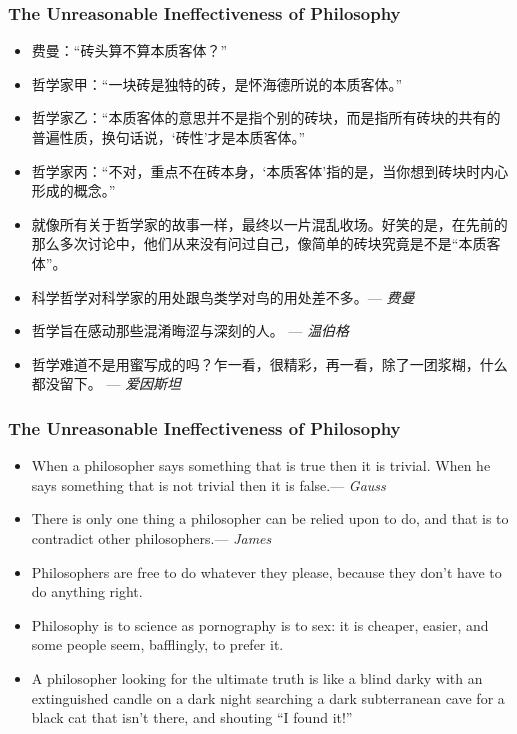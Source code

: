\documentclass[UTF8,11pt,colorlinks,compress,openany]{beamer}%
\begin{document}
\begin{frame}\frametitle{The Unreasonable Ineffectiveness of Philosophy}
	\begin{block}{}\small
		\begin{itemize}
			\item 费曼：“砖头算不算本质客体？”
			\item 哲学家甲：“一块砖是独特的砖，是怀海德所说的本质客体。” 
			\item 哲学家乙：“本质客体的意思并不是指个别的砖块，而是指所有砖块的共有的普遍性质，换句话说，‘砖性’才是本质客体。”
			\item 哲学家丙：“不对，重点不在砖本身，‘本质客体’指的是，当你想到砖块时内心形成的概念。”
			\item 就像所有关于哲学家的故事一样，最终以一片混乱收场。好笑的是，在先前的那么多次讨论中，他们从来没有问过自己，像简单的砖块究竟是不是“本质客体”。
			\item 科学哲学对科学家的用处跟鸟类学对鸟的用处差不多。\hfill --- \textsl{费曼}
		\end{itemize}
	\end{block}
\begin{itemize}
	\item 哲学旨在感动那些混淆晦涩与深刻的人。 \hfill --- \textsl{温伯格}
	\item 哲学难道不是用蜜写成的吗？乍一看，很精彩，再一看，除了一团浆糊，什么都没留下。 \hfill --- \textsl{爱因斯坦}
\end{itemize}
\end{frame}

\begin{frame}\frametitle{The Unreasonable Ineffectiveness of Philosophy}
	\begin{itemize}
		\item When a philosopher says something that is true then it is trivial. When he says something that is not trivial then it is false.\hfill --- \textsl{Gauss}
		\item There is only one thing a philosopher can be relied upon to do, and that is to contradict other philosophers.\hfill --- \textsl{James}
		\item Philosophers are free to do whatever they please, because they don't have to do anything right.
		\item Philosophy is to science as pornography is to sex: it is cheaper, easier, and some people seem, bafflingly, to prefer it.
		\item A philosopher looking for the ultimate truth is like a blind darky with an extinguished candle on a dark night searching a dark subterranean cave for a black cat that isn't there, and shouting ``I found it!''
	\end{itemize}
\end{frame}
\end{document}
